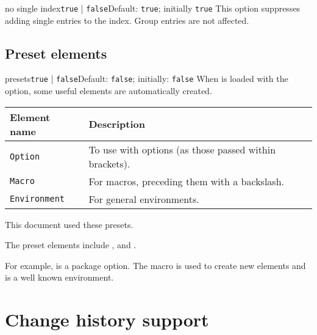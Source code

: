 \documentclass[11pt, outdir = ./out]{article}
\begin{document}
\begin{Optiondef}{no single index}{\texttt{true} | \texttt{false}}{Default: \texttt{true}; initially \texttt{true}}
    This option suppresses adding single entries to the index. Group entries are not affected.
\end{Optiondef}

\subsection{Preset elements}\label{sec:preset-elements}


\begin{Optiondef}{presets}{\texttt{true} | \texttt{false}}{Default: \texttt{false}; initially: \texttt{false}}
    When  is loaded with the  option, some useful elements are automatically created.

    \bigskip
    \begin{tabular}{ll}
        \textbf{Element name} & \textbf{Description}                                   \\
        \hline
        \texttt{Option}       & To use with options (as those passed within brackets). \\
        \texttt{Macro}        & For macros, preceding them with a backslash.           \\
        \texttt{Environment}  & For general environments.                              \\
    \end{tabular}

    \bigskip
    This document used these presets.
\end{Optiondef}


\begin{DocsExample}
    The preset elements include ,  and .

    For example,  is a package option. The  macro is used to create new elements and  is a well known environment.
\end{DocsExample}


\section{Change history support}

\begin{latexcode}
\end{latexcode}
\end{document}
